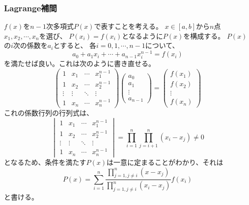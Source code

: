 \documentclass[a4j, titlepage]{jsarticle}
\numberwithin{equation}{section}
\begin{document}
        \subsubsection{Lagrange補間}
            $f(x)$を$n-1$次多項式$P(x)$で表すことを考える。
            $x\in[a,b]$から$n$点$x_1,x_2,\cdots,x_n$を選び、
            $P(x_i)=f(x_i)$となるように$P(x)$を構成する。
            $P(x)$の$i$次の係数を$a_i$とすると、
            各$i=0,1,\cdots,n-1$について、
            \begin{equation*}
                a_0 + a_1x_i + \cdots + a_{n-1}x_i^{n-1} = f(x_i)
            \end{equation*}
            を満たせば良い。これは次のように書き直せる。
            \begin{equation*}
                \begin{pmatrix}
                    1 & x_1 & \cdots & x_1^{n-1} \\
                    1 & x_2 & \cdots & x_2^{n-1} \\
                    \vdots & \vdots & \ddots & \vdots \\
                    1 & x_n & \cdots & x_n^{n-1}
                \end{pmatrix}\begin{pmatrix}
                    a_0 \\
                    a_1 \\
                    \vdots \\
                    a_{n-1}
                \end{pmatrix} = \begin{pmatrix}
                    f(x_1) \\
                    f(x_2) \\
                    \vdots \\
                    f(x_n)
                \end{pmatrix}
            \end{equation*}
            これの係数行列の行列式は、
            \begin{equation*}
                \begin{vmatrix}
                    1 & x_1 & \cdots & x_1^{n-1} \\
                    1 & x_2 & \cdots & x_2^{n-1} \\
                    \vdots & \vdots & \ddots & \vdots \\
                    1 & x_n & \cdots & x_n^{n-1}
                \end{vmatrix} = \prod_{i=1}^n\prod_{j=i+1}^n(x_i-x_j)\neq 0
            \end{equation*}
            となるため、条件を満たす$P(x)$は一意に定まることがわかり、それは
            \begin{equation}
                P(x) = \sum_{i=1}^n\frac{\displaystyle\prod_{j=1,j\neq i}^n (x-x_j)}{\displaystyle\prod_{j=1,j\neq i}^n (x_i-x_j)}f(x_i) \label{equ:lagrange}
            \end{equation}
            と書ける。
\end{document}
